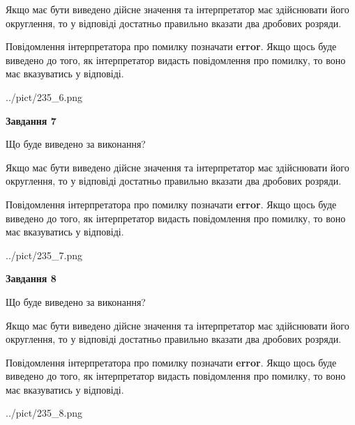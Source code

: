 \documentclass[12pt, ukrainian]{article}
\begin{document}
{\begin {Large}
Якщо має бути виведено дійсне значення та інтерпретатор має здійснювати його округлення, 
то у відповіді достатньо правильно вказати два дробових розряди.

Повідомлення інтерпретатора про помилку позначати \textbf{error}.
Якщо щось буде виведено до того, як інтерпретатор видасть повідомлення про помилку, 
то воно має вказуватись у відповіді. \par

\begin{center}
	{../pict/235_6.png}
\end{center}
\newpage

{\begin {center}\textbf{Завдання 7}\end {center}}\par
Що буде виведено за виконання? \par

Якщо має бути виведено дійсне значення та інтерпретатор має здійснювати його округлення, 
то у відповіді достатньо правильно вказати два дробових розряди.

Повідомлення інтерпретатора про помилку позначати \textbf{error}.
Якщо щось буде виведено до того, як інтерпретатор видасть повідомлення про помилку, 
то воно має вказуватись у відповіді. \par

\begin{center}
	{../pict/235_7.png}
\end{center}
\newpage

{\begin {center}\textbf{Завдання 8}\end {center}}\par
Що буде виведено за виконання? \par

Якщо має бути виведено дійсне значення та інтерпретатор має здійснювати його округлення, 
то у відповіді достатньо правильно вказати два дробових розряди.

Повідомлення інтерпретатора про помилку позначати \textbf{error}.
Якщо щось буде виведено до того, як інтерпретатор видасть повідомлення про помилку, 
то воно має вказуватись у відповіді. \par

\begin{center}
	{../pict/235_8.png}
\end{center}
\newpage


\end{Large}}
\end{document}
